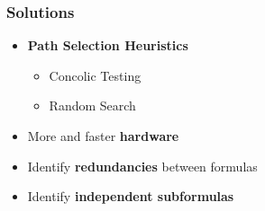 \begin{frame}
	\frametitle{Solutions}
	\begin{itemize}
		\item \textbf{Path Selection Heuristics}
		\begin{itemize}
			\item Concolic Testing
			\item Random Search
		\end{itemize}
		\item More and faster \textbf{hardware}
		\item Identify \textbf{redundancies} between formulas
		\item Identify \textbf{independent subformulas}
	\end{itemize}
\end{frame}